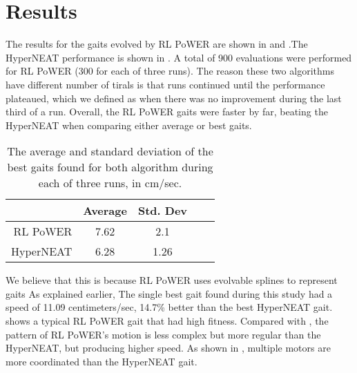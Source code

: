 \section{Results}
The results for the gaits evolved by RL PoWER are shown in  and .The HyperNEAT performance is shown in . A total of 900 evaluations were performed for RL PoWER (300 for each of three runs). The reason these two algorithms have different number of tirals is that runs continued until the performance plateaued, which we defined as when there was no improvement during the last third of a run. Overall, the RL PoWER gaits were
faster by far, beating the HyperNEAT when comparing
either average or best gaits.


\begin{table}
\begin{center}
\begin{tabular}{|r|c|c|c||c|}
\hline
                                         & Average & Std. Dev \\
\hline                                    
\hline                                    
RL PoWER                       & 7.62  &    2.1   \\
\hline
HyperNEAT                      & 6.28   &   1.26   \\
\hline
\end{tabular}
\caption{The average and standard deviation of the best gaits found
  for both algorithm during each of three runs, in cm/sec.}  
\end{center}
\end{table}



We believe that this is because RL PoWER uses evolvable splines to represent gaits As explained earlier,  
The single best gait found during this study had a speed of 11.09 centimeters/sec,  14.7\% better than the best HyperNEAT gait.  shows a typical RL PoWER gait that had high fitness. Compared with , the pattern of RL PoWER's motion is less
complex but more regular than the HyperNEAT, but producing higher speed. As shown in 
, multiple motors are more coordinated than the HyperNEAT gait. 

